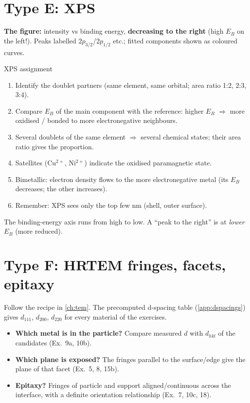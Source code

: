 \section{Type E: XPS}
\textbf{The figure:} intensity vs binding energy, \textbf{decreasing to the right} (high $E_B$ on the left!). Peaks
labelled $2p_{3/2}$/$2p_{1/2}$ etc.; fitted components shown as coloured curves.
\begin{recipe}{XPS assignment}
\begin{enumerate}
  \item Identify the doublet partners (same element, same orbital; area ratio 1:2, 2:3, 3:4).
  \item Compare $E_B$ of the main component with the reference: higher $E_B$ $\Rightarrow$ more oxidised / bonded to
        more electronegative neighbours.
  \item Several doublets of the same element $\Rightarrow$ several chemical states; their area ratio gives the proportion.
  \item Satellites (Cu$^{2+}$, Ni$^{2+}$) indicate the oxidised paramagnetic state.
  \item Bimetallic: electron density flows to the more electronegative metal (its $E_B$ decreases; the other increases).
  \item Remember: XPS sees only the top few nm (shell, outer surface).
\end{enumerate}
\end{recipe}
\begin{pitfall}
The binding-energy axis runs from high to low. A ``peak to the right'' is at \emph{lower} $E_B$ (more reduced).
\end{pitfall}

\section{Type F: HRTEM fringes, facets, epitaxy}
Follow the recipe in \cref{ch:tem}. The precomputed d-spacing table (\cref{app:dspacings}) gives $d_{111}$, $d_{200}$,
$d_{220}$ for every material of the exercises.
\begin{itemize}
  \item \textbf{Which metal is in the particle?} Compare measured $d$ with $d_{hkl}$ of the candidates (Ex.~9a, 10b).
  \item \textbf{Which plane is exposed?} The fringes parallel to the surface/edge give the plane of that facet (Ex.~5, 8, 15b).
  \item \textbf{Epitaxy?} Fringes of particle and support aligned/continuous across the interface, with a definite
        orientation relationship (Ex.~7, 10c, 18).
\end{itemize}

